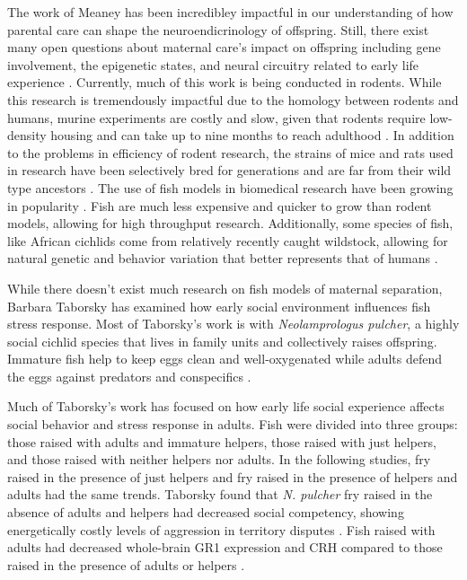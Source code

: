 \documentclass[12pt,twoside]{reedthesis}
\begin{document}
The work of Meaney has been incredibley impactful in our understanding of how
parental care can shape the neuroendicrinology of offspring. Still, there exist many
open questions about maternal care's impact on offspring including gene involvement,
the epigenetic states, and neural circuitry related to early life experience \citep{bolton_programming_2019, lesuis_early_2019,
  bayerl_brain_2019, jenkins_maternal_2018, bolton_new_2017}. Currently, much of this work is being conducted
in rodents. While this research is tremendously impactful due to the homology
between rodents and humans, murine experiments are costly and slow, given that
rodents require low-density housing and can take up to nine months to reach adulthood \citep{sengupta_laboratory_2013}. In
addition to the problems in efficiency
of rodent research, the strains of mice and rats used in research have been selectively
bred for generations and are far from their wild type ancestors
\citep{perlman_mouse_2016}. The
use of fish models in biomedical research have been growing in popularity
\citep{harris_fish_2014, cech_cellular_2011}. Fish are much less expensive and quicker to grow than rodent models,
allowing for high throughput research. Additionally, some species of fish, like
African cichlids come from relatively recently caught wildstock, allowing for
natural genetic and behavior variation that better represents that of humans
\citep{maruska_social_2019, renn_maternal_2009}.

While there doesn't exist much research on fish models of maternal separation, Barbara Taborsky has examined how early social environment influences fish
stress response.
Most of Taborsky's work is with \textit{Neolamprologus pulcher}, a highly social cichlid species
that lives in family units and collectively raises offspring. Immature fish help
to keep eggs clean and well-oxygenated while adults defend the eggs against
predators and conspecifics \citep{arnold_social_2010}.

Much of Taborsky's work has focused on
how early life social experience affects social behavior and stress response in
adults. Fish were divided into three groups: those raised with adults and
immature helpers, those raised with just helpers, and those raised with neither
helpers nor adults. In the following studies, fry raised in the presence of just
helpers and fry raised in the presence of helpers and adults had the same
trends. Taborsky found that \textit{N. pulcher} fry raised in the
absence of adults and helpers had decreased social competency, showing
energetically costly levels of aggression in territory disputes \citep{arnold_social_2010}. Fish raised with adults had decreased whole-brain GR1
expression and CRH compared to those raised in the presence of adults or helpers
\citep{taborsky_stable_2012}.
\end{document}
